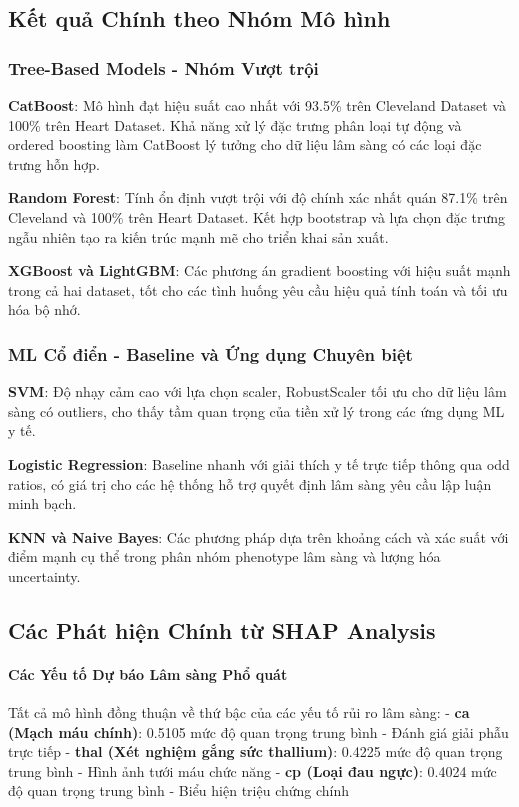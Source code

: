 \subsection{Kết quả Chính theo Nhóm Mô hình}

\subsubsection{Tree-Based Models - Nhóm Vượt trội}

\textbf{CatBoost}: Mô hình đạt hiệu suất cao nhất với 93.5\% trên Cleveland Dataset và 100\% trên Heart Dataset. Khả năng xử lý đặc trưng phân loại tự động và ordered boosting làm CatBoost lý tưởng cho dữ liệu lâm sàng có các loại đặc trưng hỗn hợp.

\textbf{Random Forest}: Tính ổn định vượt trội với độ chính xác nhất quán 87.1\% trên Cleveland và 100\% trên Heart Dataset. Kết hợp bootstrap và lựa chọn đặc trưng ngẫu nhiên tạo ra kiến trúc mạnh mẽ cho triển khai sản xuất.

\textbf{XGBoost và LightGBM}: Các phương án gradient boosting với hiệu suất mạnh trong cả hai dataset, tốt cho các tình huống yêu cầu hiệu quả tính toán và tối ưu hóa bộ nhớ.

\subsubsection{ML Cổ điển - Baseline và Ứng dụng Chuyên biệt}

\textbf{SVM}: Độ nhạy cảm cao với lựa chọn scaler, RobustScaler tối ưu cho dữ liệu lâm sàng có outliers, cho thấy tầm quan trọng của tiền xử lý trong các ứng dụng ML y tế.

\textbf{Logistic Regression}: Baseline nhanh với giải thích y tế trực tiếp thông qua odd ratios, có giá trị cho các hệ thống hỗ trợ quyết định lâm sàng yêu cầu lập luận minh bạch.

\textbf{KNN và Naive Bayes}: Các phương pháp dựa trên khoảng cách và xác suất với điểm mạnh cụ thể trong phân nhóm phenotype lâm sàng và lượng hóa uncertainty.

\subsection{Các Phát hiện Chính từ SHAP Analysis}

\paragraph{Các Yếu tố Dự báo Lâm sàng Phổ quát}
Tất cả mô hình đồng thuận về thứ bậc của các yếu tố rủi ro lâm sàng:
- \textbf{ca (Mạch máu chính)}: 0.5105 mức độ quan trọng trung bình - Đánh giá giải phẫu trực tiếp
- \textbf{thal (Xét nghiệm gắng sức thallium)}: 0.4225 mức độ quan trọng trung bình - Hình ảnh tưới máu chức năng  
- \textbf{cp (Loại đau ngực)}: 0.4024 mức độ quan trọng trung bình - Biểu hiện triệu chứng chính

